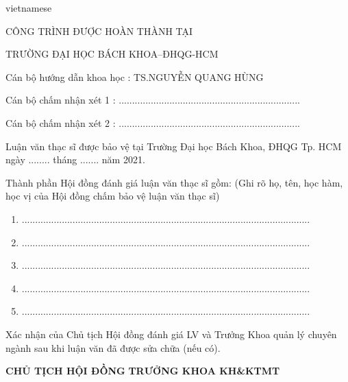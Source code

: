 \begin{titlepage}
\begin{otherlanguage*}{vietnamese}
\begin{center}
CÔNG TRÌNH ĐƯỢC HOÀN THÀNH TẠI

TRƯỜNG ĐẠI HỌC BÁCH KHOA–ĐHQG-HCM
\end{center}

\vspace*{3\bigskipamount}

Cán bộ hướng dẫn khoa học : TS.NGUYỄN QUANG HÙNG

\vspace*{1\bigskipamount}

Cán bộ chấm nhận xét 1 : ....................................................................

\vspace*{1\bigskipamount}

Cán bộ chấm nhận xét 2 : ....................................................................

\vspace*{1\bigskipamount}

Luận văn thạc sĩ được bảo vệ tại Trường Đại học Bách Khoa, ĐHQG Tp. HCM ngày ........  tháng ....... năm 2021. 

\vspace*{1\bigskipamount}

Thành phần Hội đồng đánh giá luận văn thạc sĩ gồm:
(Ghi  rõ họ, tên, học hàm, học vị của Hội đồng chấm bảo vệ luận văn thạc sĩ)
\begin{enumerate}
\item ............................................................................................................
\item ............................................................................................................
\item ............................................................................................................
\item ............................................................................................................
\item ............................................................................................................
\end{enumerate}

\vspace*{2\bigskipamount}

Xác nhận của Chủ tịch Hội đồng đánh giá LV và Trưởng Khoa quản lý chuyên ngành sau khi luận văn đã được sửa chữa (nếu có).

\vspace*{2\bigskipamount}

\textbf{CHỦ TỊCH HỘI ĐỒNG}
\hfill
\textbf{TRƯỞNG KHOA KH\&KTMT}

\end{otherlanguage*}
\end{titlepage}
	
	